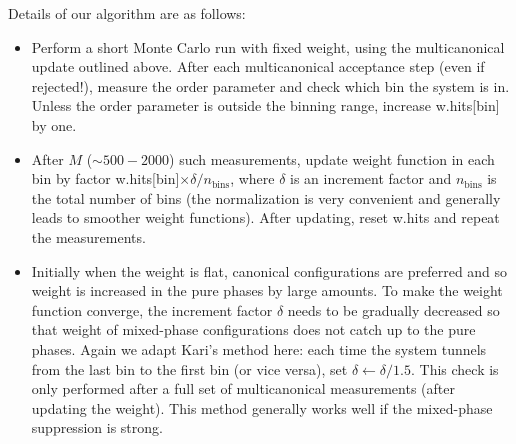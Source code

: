\documentclass[11pt,a4paper]{article}
\begin{document}
Details of our algorithm are as follows:

\begin{itemize}
	
	\item Perform a short Monte Carlo run with fixed weight, using the multicanonical update outlined above. After each multicanonical acceptance step (even if rejected!), measure the order parameter and check which bin the system is in. Unless the order parameter is outside the binning range, increase w.hits[bin] by one. 
	
	\item After $M$ ($\sim 500-2000$) such measurements, update weight function in each bin by factor w.hits[bin]$\times \delta / n_\text{bins}$, where $\delta$  is an increment factor and $n_\text{bins}$ is the total number of bins (the normalization is very convenient and generally leads to smoother weight functions). After updating, reset w.hits and repeat the measurements.
	
	\item Initially when the weight is flat, canonical configurations are preferred and so weight is increased in the pure phases by large amounts. To make the weight function converge, the increment factor $\delta$ needs to be gradually decreased so that weight of mixed-phase configurations does not catch up to the pure phases. Again we adapt Kari's method here: each time the system tunnels from the last bin to the first bin (or vice versa), set $\delta \leftarrow \delta / 1.5$. This check is only performed after a full set of multicanonical measurements (after updating the weight). This method generally works well if the mixed-phase suppression is strong. 
	
\end{itemize}
\end{document}
